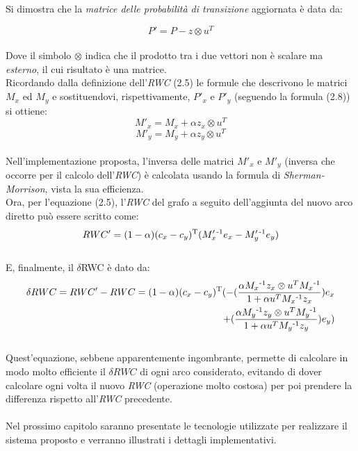 Si dimostra che la \textit{matrice delle probabilità di transizione} aggiornata è data da:

\begin{equation}
P' = P - z \otimes u^T
\end{equation}
\\
Dove il simbolo $\otimes$ indica che il prodotto tra i due vettori non è scalare ma \textit{esterno}, il cui risultato è una matrice.
\\Ricordando dalla definizione dell'\textit{RWC} (2.5) le formule che descrivono le matrici $M_x$ ed $M_y$ e sostituendovi, rispettivamente, $P'_x$ e $P'_y$ (seguendo la formula (2.8)) si ottiene:
\\
\begin{equation}
M'_x = M_x + \alpha z_x \otimes u^T
\end{equation}
\begin{equation}
M'_y = M_y + \alpha z_y \otimes u^T
\end{equation}
\\
Nell'implementazione proposta, l'inversa delle matrici $M'_x$ e $M'_y$ (inversa che occorre per il calcolo dell'\textit{RWC}) è calcolata usando la formula di \textit{Sherman-Morrison}\cite{golub:paper}, vista la sua efficienza.
\\Ora, per l'equazione (2.5), l'\textit{RWC} del grafo a seguito dell'aggiunta del nuovo arco diretto può essere scritto come:
\\
\begin{equation}
RWC' = (1 - \alpha)(c_x - c_y)\textsuperscript{T}(M'_x\textsuperscript{-1}e_x - M'_y\textsuperscript{-1}e_y)
\end{equation}
\\
E, finalmente, il $\delta$RWC è dato da:
\\
\begin{equation}
\begin{split}
\delta RWC = RWC' - RWC = (1 - \alpha)(c_x - c_y)\textsuperscript{T}(-(\frac{\alpha M_x\textsuperscript{-1}z_x \otimes u^T M_x\textsuperscript{-1}}{1 + \alpha u^T M_x\textsuperscript{-1}z_x})e_x \\+ (\frac{\alpha M_y\textsuperscript{-1}z_y \otimes u^T M_y\textsuperscript{-1}}{1 + \alpha u^T M_y\textsuperscript{-1}z_y})e_y)
\end{split}
\end{equation}
\\ 
Quest'equazione, sebbene apparentemente ingombrante, permette di calcolare in modo molto efficiente il $\delta RWC$ di ogni arco considerato, evitando di dover calcolare ogni volta il nuovo \textit{RWC} (operazione molto costosa) per poi prendere la differenza rispetto all'\textit{RWC} precedente. 
\\\\
Nel prossimo capitolo saranno presentate le tecnologie utilizzate per realizzare il sistema proposto e verranno illustrati i dettagli implementativi.

